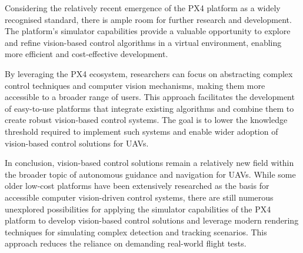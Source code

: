 Considering the relatively recent emergence of the PX4 platform as a widely recognised standard, there is ample room for further research and development. The platform's simulator capabilities provide a valuable opportunity to explore and refine vision-based control algorithms in a virtual environment, enabling more efficient and cost-effective development.

By leveraging the PX4 ecosystem, researchers can focus on abstracting complex control techniques and computer vision mechanisms, making them more accessible to a broader range of users. This approach facilitates the development of easy-to-use platforms that integrate existing algorithms and combine them to create robust vision-based control systems. The goal is to lower the knowledge threshold required to implement such systems and enable wider adoption of vision-based control solutions for UAVs.


In conclusion, vision-based control solutions remain a relatively new field within the broader topic of autonomous guidance and navigation for UAVs. While some older low-cost platforms have been extensively researched as the basis for accessible computer vision-driven control systems, there are still numerous unexplored possibilities for applying the simulator capabilities of the PX4 platform to develop vision-based control solutions and leverage modern rendering techniques for simulating complex detection and tracking scenarios. This approach reduces the reliance on demanding real-world flight tests.